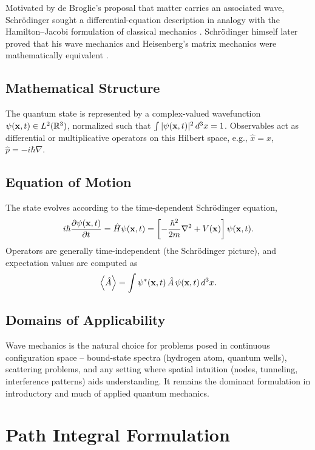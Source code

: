 \documentclass[11pt,a4paper]{article}
\begin{document}
Motivated by de Broglie's proposal that matter carries an associated wave, Schr\"odinger sought a differential-equation description in analogy with the Hamilton--Jacobi formulation of classical mechanics \citep{schrodinger1926}. Schr\"odinger himself later proved that his wave mechanics and Heisenberg's matrix mechanics were mathematically equivalent \citep{schrodinger1926b}.

\subsection{Mathematical Structure}

The quantum state is represented by a complex-valued wavefunction $\psi(\vb{x}, t) \in L^2(\mathbb{R}^3)$, normalized such that $\int |\psi(\vb{x},t)|^2\, d^3x = 1$. Observables act as differential or multiplicative operators on this Hilbert space, e.g., $\hat{x} = x$, $\hat{p} = -i\hbar \nabla$.

\subsection{Equation of Motion}

The state evolves according to the time-dependent Schr\"odinger equation,
\begin{equation}
    i\hbar \pdv{\psi(\vb{x},t)}{t} = \hat{H}\psi(\vb{x},t) = \left[-\frac{\hbar^2}{2m}\nabla^2 + V(\vb{x})\right]\psi(\vb{x},t).
\end{equation}
Operators are generally time-independent (the Schr\"odinger picture), and expectation values are computed as
\begin{equation}
    \expval{\hat{A}} = \int \psi^*(\vb{x},t)\, \hat{A}\, \psi(\vb{x},t) \, d^3x.
\end{equation}

\subsection{Domains of Applicability}

Wave mechanics is the natural choice for problems posed in continuous configuration space -- bound-state spectra (hydrogen atom, quantum wells), scattering problems, and any setting where spatial intuition (nodes, tunneling, interference patterns) aids understanding. It remains the dominant formulation in introductory and much of applied quantum mechanics.

\section{Path Integral Formulation}
\end{document}
